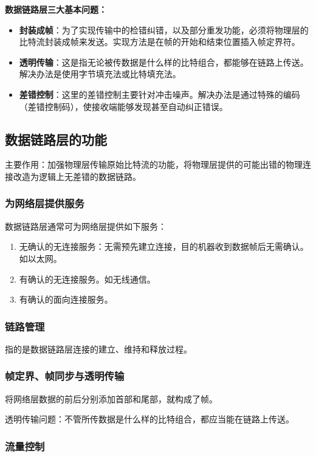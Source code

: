 \documentclass[12pt, a4paper, oneside]{ctexart}
\begin{document}
\textbf{数据链路层三大基本问题：}
\begin{itemize}
    \item {\bf 封装成帧}：为了实现传输中的检错纠错，以及部分重发功能，必须将物理层的比特流封装成帧来发送。实现方法是在帧的开始和结束位置插入帧定界符。
    \item {\bf 透明传输}：这是指无论被传数据是什么样的比特组合，都能够在链路上传送。解决办法是使用字节填充法或比特填充法。
    \item {\bf 差错控制}：这里的差错控制主要针对冲击噪声。解决办法是通过特殊的编码（差错控制码），使接收端能够发现甚至自动纠正错误。
\end{itemize}

\subsection{数据链路层的功能}

主要作用：加强物理层传输原始比特流的功能，将物理层提供的可能出错的物理连接改造为逻辑上无差错的数据链路。

\subsubsection{为网络层提供服务}

数据链路层通常可为网络层提供如下服务：
\begin{enumerate}
    \item 无确认的无连接服务：无需预先建立连接，目的机器收到数据帧后无需确认。如以太网。
    \item 有确认的无连接服务。如无线通信。
    \item 有确认的面向连接服务。
\end{enumerate}

\subsubsection{链路管理}

指的是数据链路层连接的建立、维持和释放过程。

\subsubsection{帧定界、帧同步与透明传输}

将网络层数据的前后分别添加首部和尾部，就构成了帧。

透明传输问题：不管所传数据是什么样的比特组合，都应当能在链路上传送。

\subsubsection{流量控制}
\end{document}
